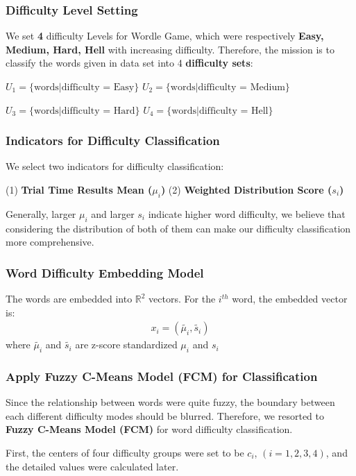 \subsubsection{Difficulty Level Setting}
We set \textbf{4} difficulty Levels for Wordle Game, which were respectively \textbf{Easy, Medium, Hard, Hell} with increasing difficulty. Therefore, the mission is to classify the words given in data set into 4 \textbf{difficulty sets}:

\qquad $U_{1}=\{\text{words} | \text{difficulty = Easy}\}$ \quad $U_{2}=\{\text{words}|\text{difficulty = Medium}\}$

\qquad $U_{3}=\{\text{words} | \text{difficulty = Hard}\}$ \quad $U_{4}=\{\text{words}|\text{difficulty = Hell}\}$

\subsubsection{Indicators for Difficulty Classification}
We select two indicators for difficulty classification:

    (1) \textbf{Trial Time Results Mean ($\mu_{i}$)} \qquad (2) \textbf{Weighted Distribution Score ($s_{i}$)}

Generally, larger $\mu_{i}$ and larger $s_{i}$ indicate higher word difficulty, we believe that considering the distribution of both of them can make our difficulty classification more comprehensive. 

\subsubsection{Word Difficulty Embedding Model}
The words are embedded into $\mathbb{R}^{2}$ vectors. For the $i^{th}$ word, the embedded vector is:
\begin{align}
    x_{i}=(\tilde{\mu_{i}},\tilde{s_{i}})
    \label{z-score}
\end{align}
where $\tilde{\mu_{i}}$ and $\tilde{s_{i}}$ are z-score standardized $\mu_{i}$ and $s_{i}$ 
\subsubsection{Apply Fuzzy C-Means Model (FCM) for Classification}
Since the relationship between words were quite fuzzy, the boundary between each different difficulty modes should be blurred. Therefore, we resorted to \textbf{Fuzzy C-Means Model (FCM)} for word difficulty classification.

First, the centers of four difficulty groups were set to be $c_{i}$, $(i=1,2,3,4)$, and the detailed values were calculated later.


